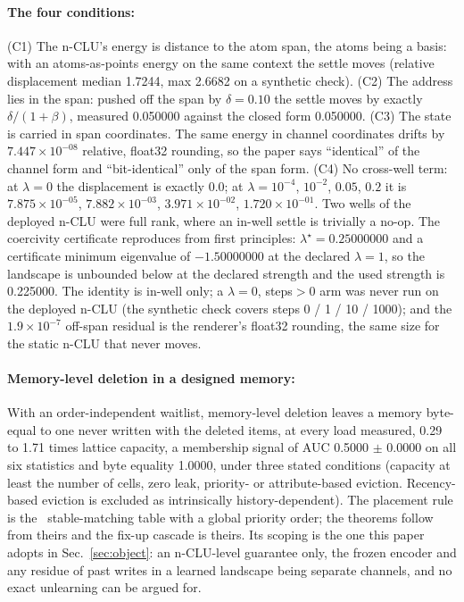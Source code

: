 \documentclass{article} %
\newcommand{\sci}[2]{\ensuremath{#1\times10^{#2}}}
\begin{document}
\paragraph{The four conditions:} (C1) The n-CLU's energy is distance to the atom span, the atoms
being a basis: with an atoms-as-points energy on the same context the settle moves (relative
displacement median 1.7244, max 2.6682 on a synthetic check). (C2) The address lies in the span:
pushed off the span by $\delta=0.10$ the settle moves by exactly $\delta/(1+\beta)$, measured
0.050000 against the closed form 0.050000. (C3) The state is carried in span coordinates. The same
energy in channel coordinates drifts by \sci{7.447}{-08} relative, float32 rounding, so the paper
says ``identical'' of the channel form and ``bit-identical'' only of the span form. (C4) No
cross-well term: at $\lambda=0$ the displacement is exactly 0.0; at
$\lambda=10^{-4}$, $10^{-2}$, $0.05$, $0.2$ it is \sci{7.875}{-05}, \sci{7.882}{-03},
\sci{3.971}{-02}, \sci{1.720}{-01}. Two wells of the deployed n-CLU were full rank, where an in-well
settle is trivially a no-op. The coercivity certificate reproduces from first principles:
$\lambda^\star=0.25000000$ and a certificate minimum eigenvalue of $-1.50000000$ at the declared
$\lambda=1$, so the landscape is unbounded below at the declared strength and the used strength is
0.225000. %
The identity is in-well only; a $\lambda=0$, steps$>0$ arm was never run on the deployed n-CLU (the
synthetic check covers steps 0 / 1 / 10 / 1000); and the \sci{1.9}{-7} off-span residual is the
renderer's float32 rounding, the same size for the static n-CLU that never moves.



\paragraph{Memory-level deletion in a designed memory:} With an order-independent waitlist, memory-level deletion leaves a memory
byte-equal to one never written with the deleted items, at every load measured, 0.29 to 1.71 times lattice capacity, a membership signal of AUC 0.5000 $\pm$ 0.0000 on all
six statistics and byte equality 1.0000, under three stated conditions (capacity at least the number
of cells, zero leak, priority- or attribute-based eviction. Recency-based eviction is excluded as
intrinsically history-dependent). %
The placement rule is the~\citet{blelloch_strongly_2007} stable-matching table with a global priority order;
the theorems follow from theirs and the fix-up cascade is theirs. Its scoping is the one this
paper adopts in Sec.~\ref{sec:object}: an n-CLU-level guarantee only, the frozen encoder and any
residue of past writes in a learned landscape being separate channels, and no exact unlearning can be argued for.
\end{document}
